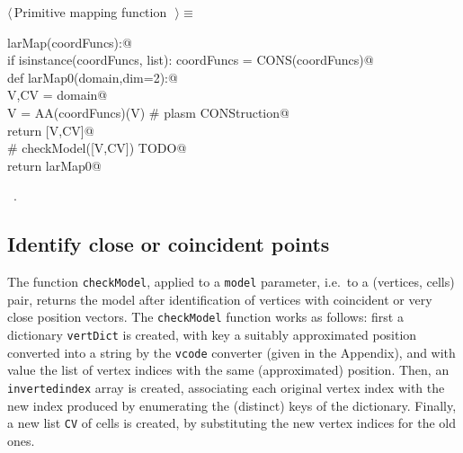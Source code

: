 \documentclass[11pt,oneside]{article}	%
\begin{document}
\begin{flushleft} \small \label{scrap3}
$\langle\,$Primitive mapping function\nobreak\ {\footnotesize {}}$\,\rangle\equiv$
\vspace{-1ex}
\begin{list}{}{} \item
\mbox{}\verb@def larMap(coordFuncs):@\\
\mbox{}\verb@   if isinstance(coordFuncs, list): coordFuncs = CONS(coordFuncs)@\\
\mbox{}\verb@   def larMap0(domain,dim=2):@\\
\mbox{}\verb@      V,CV = domain@\\
\mbox{}\verb@      V = AA(coordFuncs)(V)  # plasm CONStruction@\\
\mbox{}\verb@      return [V,CV]@\\
\mbox{}\verb@      # checkModel([V,CV])  TODO@\\
\mbox{}\verb@   return larMap0@\\
\mbox{}\verb@@{\NWsep}
\end{list}
\vspace{-1ex}
\footnotesize\addtolength{\baselineskip}{-1ex}
\begin{list}{}{\setlength{\itemsep}{-\parsep}\setlength{\itemindent}{-\leftmargin}}
\item \NWtxtMacroRefIn\ .
\end{list}
\end{flushleft}

\subsection{Identify close or coincident points}

The function \texttt{checkModel}, applied to a \texttt{model} parameter, i.e.~to a (vertices, cells)  pair, returns the model after identification of vertices with coincident or very close position vectors.
The \texttt{checkModel} function works as follows: first a dictionary \texttt{vertDict} is created, with key a suitably approximated position converted into a string by the \texttt{vcode} converter (given in the Appendix), and with value the list of vertex indices with the same (approximated) position. Then, an \texttt{invertedindex} array is created, associating each original vertex index with the new index produced by enumerating the (distinct) keys of the dictionary. Finally, a new list \texttt{CV} of cells is created, by substituting the new vertex indices for the old ones. 
\end{document}
